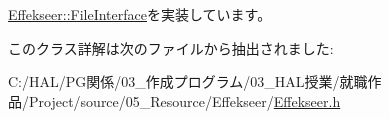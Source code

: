 \mbox{\hyperlink{class_effekseer_1_1_file_interface_a1e60cb81a5cae39b37e44570ef693d91}{Effekseer\+::\+File\+Interface}}を実装しています。



このクラス詳解は次のファイルから抽出されました\+:\begin{DoxyCompactItemize}
\item 
C\+:/\+H\+A\+L/\+P\+G関係/03\+\_\+作成プログラム/03\+\_\+\+H\+A\+L授業/就職作品/\+Project/source/05\+\_\+\+Resource/\+Effekseer/\mbox{\hyperlink{_effekseer_8h}{Effekseer.\+h}}\end{DoxyCompactItemize}
